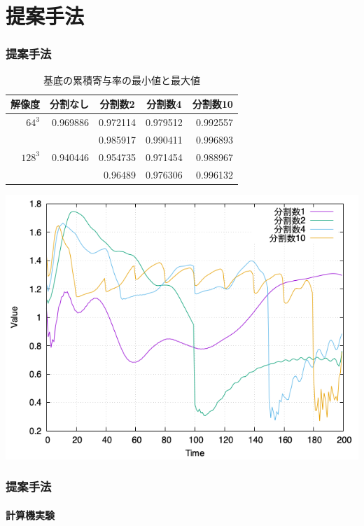 \documentclass[aspectratio=169,dvipdfmx,hyperref={bookmarks=true}]{beamer}
\begin{document}
\section{提案手法}
\begin{frame}
\frametitle{提案手法}
\begin {table}[htbp]
    \centering
  \caption{基底の累積寄与率の最小値と最大値}
  \label{tab:ruiseki}
  \begin {tabular}{rrrrr} \hline
    \multicolumn{1}{c}{解像度} 					&\multicolumn{1}{c}{分割なし} 		&\multicolumn{1}{c}{分割数2}			&\multicolumn{1}{c}{分割数4} 		&\multicolumn{1}{c}{分割数10}\\ \hline
    $64^3$ 									& 0.969886					& 0.972114						&0.979512	 				&0.992557				\\
    										&							&0.985917						&0.990411					&0.996893				\\ \hline
    $128^3$ 								&0.940446 					&0.954735						&0.971454	 				&0.988967				\\ 
    										&							&0.96489							&0.976306					&0.996132				\\	\hline
  \end {tabular}
\end {table}
	\includegraphics[width=0.5\linewidth]{images/128error.png}
 \end{frame}
 \begin{frame}
 \frametitle{提案手法}
 \framesubtitle{計算機実験}

\begin{columns}
    \begin{column}{0.33\textwidth}
    \end{column}
    \begin{column}{0.33\textwidth}
    \end{column}
    \begin{column}{0.33\textwidth}
    \end{column}
\end{columns}
\end{frame}
\end{document}
